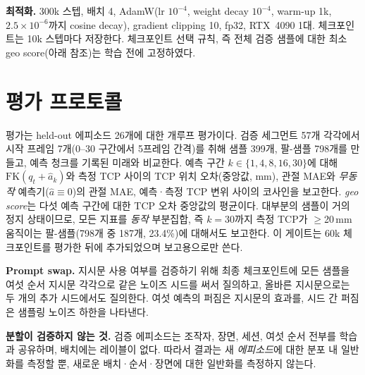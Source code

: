 \documentclass[conference,10pt]{IEEEtran}
\newcommand{\mm}{\,mm\xspace}
\begin{document}
\textbf{최적화.} 300k 스텝, 배치 4, AdamW(lr $10^{-4}$, weight decay $10^{-4}$, warm-up 1k, $2.5\times10^{-6}$까지 cosine decay),
gradient clipping 10, fp32, RTX~4090 1대. 체크포인트는 10k 스텝마다 저장한다. 체크포인트 선택 규칙, 즉 전체 검증 샘플에 대한
최소 geo score(아래 참조)는 학습 전에 고정하였다.

\section{평가 프로토콜}\label{p1:sec:eval}
평가는 held-out 에피소드 26개에 대한 개루프 평가이다. 검증 세그먼트 57개 각각에서 시작 프레임 7개(0--30 구간에서 5프레임 간격)를
취해 샘플 399개, 팔-샘플 798개를 만들고, 예측 청크를 기록된 미래와 비교한다. 예측 구간 $k\in\{1,4,8,16,30\}$에 대해
$\mathrm{FK}(q_t+\hat a_k)$와 측정 TCP 사이의 TCP 위치 오차(중앙값, mm), 관절 MAE와 \emph{무동작} 예측기($\hat a\equiv0$)의 관절
MAE, 예측·측정 TCP 변위 사이의 코사인을 보고한다. \emph{geo score}는 다섯 예측 구간에 대한 TCP 오차 중앙값의 평균이다. 대부분의
샘플이 거의 정지 상태이므로, 모든 지표를 \emph{동작} 부분집합, 즉 $k{=}30$까지 측정 TCP가 $\ge$20\mm 움직이는 팔-샘플(798개 중
187개, 23.4\%)에 대해서도 보고한다. 이 게이트는 60k 체크포인트를 평가한 뒤에 추가되었으며 보고용으로만 쓴다.

\textbf{Prompt swap.} 지시문 사용 여부를 검증하기 위해 최종 체크포인트에 모든 샘플을 여섯 순서 지시문 각각으로 같은 노이즈 시드를
써서 질의하고, 올바른 지시문으로는 두 개의 추가 시드에서도 질의한다. 여섯 예측의 퍼짐은 지시문의 효과를, 시드 간 퍼짐은 샘플링
노이즈 하한을 나타낸다.

\textbf{분할이 검증하지 않는 것.} 검증 에피소드는 조작자, 장면, 세션, 여섯 순서 전부를 학습과 공유하며, 배치에는 레이블이 없다.
따라서 결과는 새 \emph{에피소드}에 대한 분포 내 일반화를 측정할 뿐, 새로운 배치·순서·장면에 대한 일반화를 측정하지 않는다.
\end{document}
